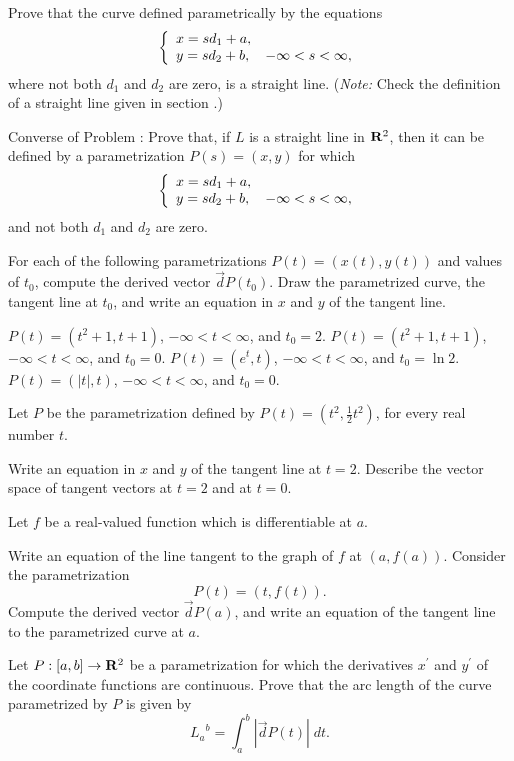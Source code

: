 \begin{exercises}
Prove that the curve defined parametrically by the
equations
\[
\left\{ \begin{array}{ll} x = sd_1 + a, \\ y = sd_2 + b, \quad -\infty < s < \infty, \end{array} \right.
\]
where not both $d_1$ and $d_2$ are zero,
is a straight line.
(\emph{Note:} Check the definition of a straight
line given in section .)

Converse of Problem :
Prove that, if $L$ is a straight line in $\mathrm{\bf R}^2$,
then it can be defined by a parametrization
$P(s) = (x,y)$ for which
\[
\left\{ \begin{array}{ll} x = sd_1 + a, \\ y = sd_2 + b, \quad -\infty < s < \infty, \end{array} \right.
\]
and not both $d_1$ and $d_2$ are zero.

For each of the following parametrizations
$P(t) = (x(t),y(t))$ and values of $t_0$,
compute the derived vector $\vec dP(t_0)$.
Draw the parametrized curve, the tangent
line at $t_0$, and write an equation in $x$
and $y$ of the tangent line.
\begin{exenum}
\x
$P(t) = (t^2+1, t+1)$, $-\infty < t < \infty$,
and $t_0 = 2$.
\x
$P(t) = (t^2+1, t+1)$, $-\infty < t < \infty$,
and $t_0 = 0$.
\x
$P(t) = (e^t,t)$, $-\infty <t<\infty$,
and $t_0 = \ln 2$.
\x
$P(t) = (|t|, t)$, $-\infty < t < \infty$,
and $t_0 = 0$.
\end{exenum}

Let $P$ be the parametrization defined by
$P(t) = (t^2, \frac12t^2)$, for every real number $t$.
\begin{exenum}
\x
Write an equation in $x$ and $y$ of the tangent line
at $t=2$.
\x
Describe the vector space of tangent vectors
at $t=2$ and at $t=0$.
\end{exenum}

Let $f$ be a real-valued function which is
differentiable at $a$.
\begin{exenum}
\x
Write an equation of the line tangent to the graph
of $f$ at $(a,f(a))$.
\x
Consider the parametrization
\[
P(t) = (t,f(t))
.
\]
Compute the derived vector $\vec dP(a)$,
and write an equation of the tangent line
to the parametrized curve at $a$.
\end{exenum}

Let $P:[a,b]\rightarrow\mathrm{\bf R}^2$ be a parametrization
for which the derivatives $x^\prime$ and $y^\prime$
of the coordinate functions are continuous.
Prove that the arc length of the curve
parametrized by $P$ is given by
\[
{L_a}^b = \int_a^b |\vec dP(t)| \; dt
.
\]

\end{exercises}
